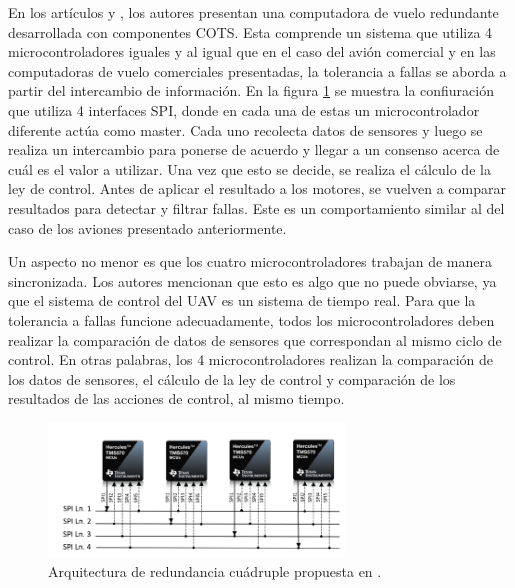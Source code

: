 En los artículos \cite{hiergeist2018implementation} y \cite{hiergeist2017internal}, los autores presentan una computadora de vuelo redundante desarrollada con componentes COTS. Esta comprende un sistema que utiliza 4 microcontroladores iguales y al igual que en el caso del avión comercial y en las computadoras de vuelo comerciales presentadas, la tolerancia a fallas se aborda a partir del intercambio de información. En la figura \ref{fig:redundancy_SPI} se muestra la confiuración que utiliza 4 interfaces SPI, donde en cada una de estas un microcontrolador diferente actúa como master. Cada uno recolecta datos de sensores y luego se realiza un intercambio para ponerse de acuerdo y llegar a un consenso acerca de cuál es el valor a utilizar. Una vez que esto se decide, se realiza el cálculo de la ley de control. Antes de aplicar el resultado a los motores, se vuelven a comparar resultados para detectar y filtrar fallas. Este es un comportamiento similar al del caso de los aviones presentado anteriormente.

Un aspecto no menor es que los cuatro microcontroladores trabajan de manera sincronizada. Los autores mencionan que esto es algo que no puede obviarse, ya que el sistema de control del UAV es un sistema de tiempo real. Para que la tolerancia a fallas funcione adecuadamente, todos los microcontroladores deben realizar la comparación de datos de sensores que correspondan al mismo ciclo de control. En otras palabras, los 4 microcontroladores realizan la comparación de los datos de sensores, el cálculo de la ley de control y comparación de los resultados de las acciones de control, al mismo tiempo. %

\begin{figure}[htb]
    \centering
    \includegraphics[width=0.7\textwidth]{img/redundancy_SPI.png}
    \caption{Arquitectura de redundancia cuádruple propuesta en \cite{hiergeist2018implementation}.}
    \label{fig:redundancy_SPI}
\end{figure}

